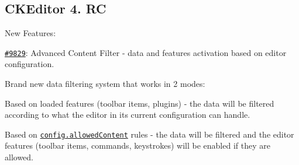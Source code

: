 {\ttfamily \subsection*{C\+K\+Editor 4. RC}}

{\ttfamily }

{\ttfamily New Features\+:}

{\ttfamily 
\begin{DoxyItemize}
\item \href{http://dev.ckeditor.com/ticket/9829}{\tt \#9829}\+: Advanced Content Filter -\/ data and features activation based on editor configuration.

Brand new data filtering system that works in 2 modes\+:
\begin{DoxyItemize}
\item Based on loaded features (toolbar items, plugins) -\/ the data will be filtered according to what the editor in its current configuration can handle.
\item Based on \href{http://docs.ckeditor.com/#!/api/CKEDITOR.config-cfg-allowedContent}{\tt {\ttfamily config.\+allowed\+Content}} rules -\/ the data will be filtered and the editor features (toolbar items, commands, keystrokes) will be enabled if they are allowed.
\end{DoxyItemize}


\end{DoxyItemize}}
